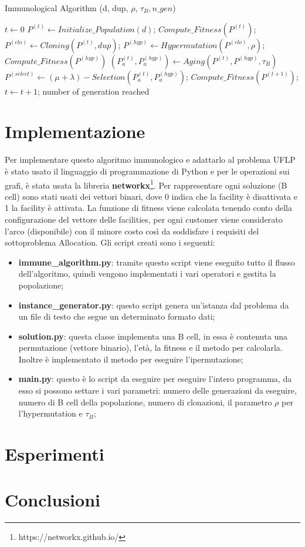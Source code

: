 \documentclass[a4paper,12pt,titlepage,oneside]{article}
\begin{document}
\begin{enumerate}
\begin{algorithm}
\caption{Immunological Algorithm (d, dup, $\rho$, $\tau_{B}, n\_gen$)}\label{euclid}
\begin{algorithmic}[1]
\State $t \gets 0$
\State $P^{(t)} \gets Initialize\_Population(d)$;
\State $Compute\_Fitness(P^{(t)})$;
\Repeat
\State $P^{(clo)} \gets Cloning(P^{(t)},dup)$;
\State $P^{(hyp)} \gets Hypermutation(P^{(clo)},\rho)$;
\State $Compute\_Fitness(P^{(hyp)})$
\State $(P_{a}^{(t)},P_{a}^{(hyp)}) \gets Aging(P^{(t)}, P^{(hyp)}, \tau_B)$
\State $P^{(select)} \gets (\mu + \lambda)-Selection(P_a^{(t)}, P_a^{(hyp)})$;
\State $Compute\_Fitness(P^{(t+1)})$;
\State $t \gets t + 1$;
\Until number of generation reached
\end{algorithmic}
\end{algorithm}
\end{enumerate}

\section{Implementazione}
Per implementare questo algoritmo immunologico e adattarlo al problema UFLP è stato usato il linguaggio di programmazione di Python e per le operazioni sui grafi, è stata usata la libreria \textbf{networkx}\footnote[10]{https://networkx.github.io/}. Per rappresentare ogni soluzione (B cell) sono stati usati dei vettori binari, dove 0 indica che la facility è disattivata e 1 la facility è attivata. La funzione di fitness viene calcolata tenendo conto della configurazione del vettore delle facilities, per ogni customer viene considerato l'arco (disponibile) con il minore costo così da soddisfare i requisiti del sottoproblema Allocation. Gli script creati sono i seguenti:
\begin{itemize}
  \item \textbf{immune\_algorithm.py}: tramite questo script viene eseguito tutto il flusso dell'algoritmo, quindi vengono implementati i vari operatori e gestita la popolazione;
  \item \textbf{instance\_generator.py}: questo script genera un'istanza dal problema da un file di testo che segue un determinato formato dati;
  \item \textbf{solution.py}: questa classe implementa una B cell, in essa è contenuta una permutazione (vettore binario), l'età, la fitness e il metodo per calcolarla. Inoltre è implementato il metodo per eseguire l'ipermutazione;
  \item \textbf{main.py}: questo è lo script da eseguire per eseguire l'intero programma, da esso si possono settare i vari parametri: numero delle generazioni da eseguire, numero di B cell della popolazione, numero di clonazioni, il parametro $\rho$ per l'hypermutation e $\tau_{B}$;
\end{itemize}
\section{Esperimenti}

\section{Conclusioni}
\newpage
{}

\end{document}
